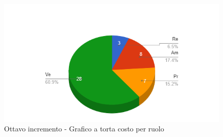 {{        \begin{figure}[H]
          \includegraphics[width=15cm]{sezioni/Images/ottavoT.png}
          \centering
          \caption{Ottavo incremento - Grafico a torta costo per ruolo}
       \end{figure}
    }

    }


